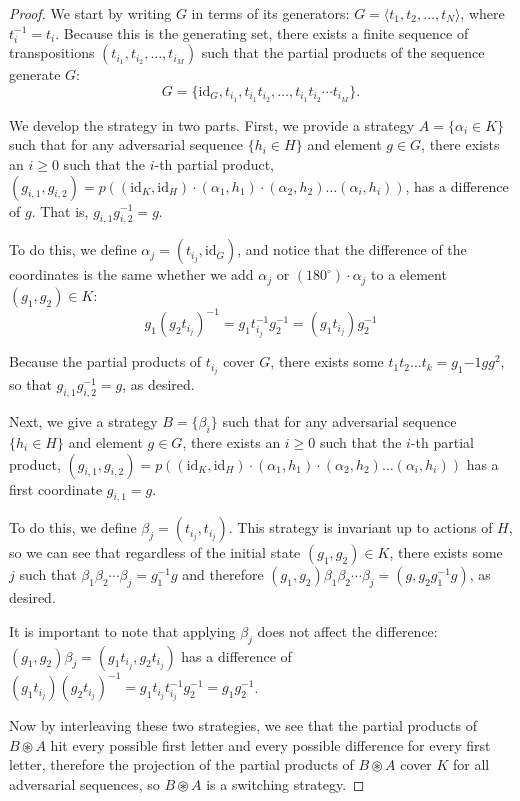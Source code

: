 \begin{proof}
  We start by writing $G$ in terms of its generators:
  $G = \langle t_1, t_2, \dots, t_N \rangle$, where $t_i^{-1} = t_i$.
  Because this is the generating set, there exists a finite sequence of
  transpositions $(t_{i_1}, t_{i_2}, \dots, t_{i_M})$
  such that the partial products of the sequence generate $G$: \begin{equation}
    G = \{\mathrm{id}_G, t_{i_1}, t_{i_1}t_{i_2}, \dots, t_{i_1}t_{i_2}\cdots t_{i_M}\}.
  \end{equation}

  We develop the strategy in two parts. First, we provide a strategy
  $A = \{\alpha_i \in K\}$ such that for any adversarial sequence $\{h_i \in H\}$
  and element $g \in G$, there exists an $i \geq 0$
  such that the {$i$-th} partial product,
  $(g_{i,1}, g_{i,2}) = p((\mathrm{id}_K, \mathrm{id}_H)\cdot(\alpha_1, h_1)\cdot(\alpha_2, h_2)\dots(\alpha_i, h_i))$,
  has a difference of $g$. That is, $g_{i,1}g_{i,2}^{-1} = g$.

  To do this, we define $\alpha_j = (t_{i_j}, \mathrm{id}_G)$,
  and notice that the difference of the coordinates is the same whether we
  add $\alpha_j$ or $(180^\circ)\cdot \alpha_j$ to a element
  $(g_1, g_2) \in K$: \begin{equation}
    g_1(g_2t_{i_j})^{-1} = g_1t_{i_j}^{-1}g_2^{-1} = (g_1t_{i_j})g_2^{-1}
  \end{equation}

  Because the partial products of $t_{i_j}$ cover $G$, there exists some
  $t_1 t_2\dots t_k = g_1{-1}gg^2$, so that $g_{i,1}g_{i,2}^{-1} = g$, as
  desired.

  Next, we give a strategy $B = \{\beta_i\}$ such that for any adversarial
  sequence $\{h_i \in H\}$ and element $g \in G$, there exists an $i \geq 0$
  such that the {$i$-th} partial product,
  $(g_{i,1}, g_{i,2}) = p((\mathrm{id}_K, \mathrm{id}_H)\cdot(\alpha_1, h_1)\cdot(\alpha_2, h_2)\dots(\alpha_i, h_i))$
  has a first coordinate $g_{i,1} = g$.

  To do this, we define $\beta_j = (t_{i_j}, t_{i_j})$. This strategy is
  invariant up to actions of $H$, so we can see that regardless of the initial
  state $(g_1, g_2) \in K$, there exists some $j$ such that
   $\beta_1 \beta_2 \cdots \beta_j = g_1^{-1}g$ and therefore
   $(g_1, g_2) \beta_1 \beta_2 \cdots \beta_j = (g, g_2g_1^{-1}g)$, as desired.

   It is important to note that applying $\beta_j$ does not affect the
   difference: $(g_1, g_2) \beta_j = (g_1t_{i_j}, g_2t_{i_j})$ has a
   difference of
   $(g_1t_{i_j})(g_2t_{i_j})^{-1} = g_1t_{i_j}t_{i_j}^{-1}g_2^{-1} = g_1g_2^{-1}$.

  Now by interleaving these two strategies, we see that the partial products
  of $B \circledast A$ hit every possible first letter and every possible
  difference for every first letter,
  therefore the projection of the partial products of
  $B \circledast A$ cover $K$ for all adversarial sequences, so
  $B \circledast A$ is a switching strategy.
\end{proof}
